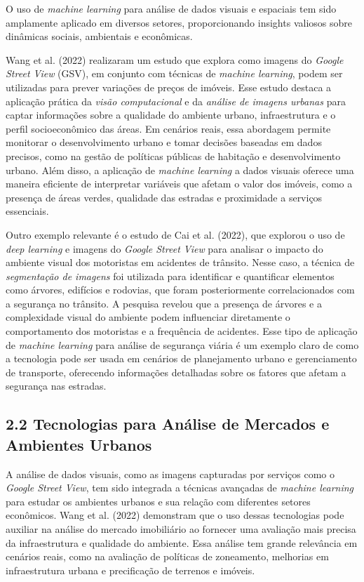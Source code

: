 \documentclass{article}
\begin{document}
O uso de \textit{machine learning} para análise de dados visuais e espaciais tem sido amplamente aplicado em diversos setores, proporcionando insights valiosos sobre dinâmicas sociais, ambientais e econômicas.

Wang et al. (2022) realizaram um estudo que explora como imagens do \textit{Google Street View} (GSV), em conjunto com técnicas de \textit{machine learning}, podem ser utilizadas para prever variações de preços de imóveis. Esse estudo destaca a aplicação prática da \textit{visão computacional} e da \textit{análise de imagens urbanas} para captar informações sobre a qualidade do ambiente urbano, infraestrutura e o perfil socioeconômico das áreas. Em cenários reais, essa abordagem permite monitorar o desenvolvimento urbano e tomar decisões baseadas em dados precisos, como na gestão de políticas públicas de habitação e desenvolvimento urbano. Além disso, a aplicação de \textit{machine learning} a dados visuais oferece uma maneira eficiente de interpretar variáveis que afetam o valor dos imóveis, como a presença de áreas verdes, qualidade das estradas e proximidade a serviços essenciais.

Outro exemplo relevante é o estudo de Cai et al. (2022), que explorou o uso de \textit{deep learning} e imagens do \textit{Google Street View} para analisar o impacto do ambiente visual dos motoristas em acidentes de trânsito. Nesse caso, a técnica de \textit{segmentação de imagens} foi utilizada para identificar e quantificar elementos como árvores, edifícios e rodovias, que foram posteriormente correlacionados com a segurança no trânsito. A pesquisa revelou que a presença de árvores e a complexidade visual do ambiente podem influenciar diretamente o comportamento dos motoristas e a frequência de acidentes. Esse tipo de aplicação de \textit{machine learning} para análise de segurança viária é um exemplo claro de como a tecnologia pode ser usada em cenários de planejamento urbano e gerenciamento de transporte, oferecendo informações detalhadas sobre os fatores que afetam a segurança nas estradas.

\subsection*{2.2 Tecnologias para Análise de Mercados e Ambientes Urbanos}

A análise de dados visuais, como as imagens capturadas por serviços como o \textit{Google Street View}, tem sido integrada a técnicas avançadas de \textit{machine learning} para estudar os ambientes urbanos e sua relação com diferentes setores econômicos. Wang et al. (2022) demonstram que o uso dessas tecnologias pode auxiliar na análise do mercado imobiliário ao fornecer uma avaliação mais precisa da infraestrutura e qualidade do ambiente. Essa análise tem grande relevância em cenários reais, como na avaliação de políticas de zoneamento, melhorias em infraestrutura urbana e precificação de terrenos e imóveis.
\end{document}
